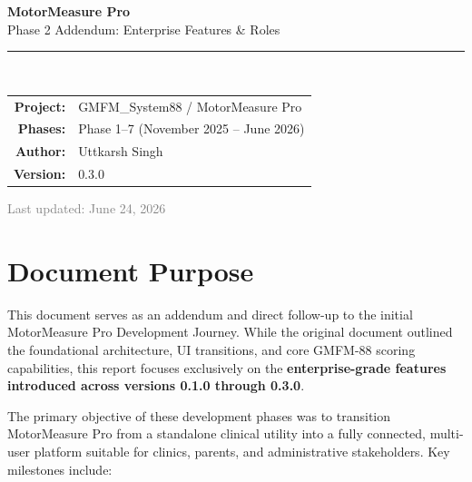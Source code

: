 \documentclass[12pt,a4paper]{article}
\begin{document}
\begin{titlepage}
\centering
\vspace*{3cm}

{\Huge\bfseries\textcolor{darkbg}{MotorMeasure Pro}}\\[0.5cm]
{\Large\textcolor{primaryteal}{Phase 2 Addendum: Enterprise Features \& Roles}}\\[2cm]

\textcolor{primaryteal}{\rule{0.6\textwidth}{2pt}}\\[1.5cm]

\begin{tabular}{rl}
    \textbf{Project:}     & GMFM\_System88 / MotorMeasure Pro \\[0.3cm]
    \textbf{Phases:}      & Phase 1--7 (November 2025 -- June 2026) \\[0.3cm]
    \textbf{Author:}      & Uttkarsh Singh \\[0.3cm]
    \textbf{Version:}     & 0.3.0 \\
\end{tabular}

\vfill
{\small\textcolor{gray}{Last updated: June 24, 2026}}
\end{titlepage}

\tableofcontents
\newpage

\section{Document Purpose}

This document serves as an addendum and direct follow-up to the initial MotorMeasure Pro Development Journey. While the original document outlined the foundational architecture, UI transitions, and core GMFM-88 scoring capabilities, this report focuses exclusively on the \textbf{enterprise-grade features introduced across versions 0.1.0 through 0.3.0}. 

The primary objective of these development phases was to transition MotorMeasure Pro from a standalone clinical utility into a fully connected, multi-user platform suitable for clinics, parents, and administrative stakeholders. Key milestones include:
\end{document}

